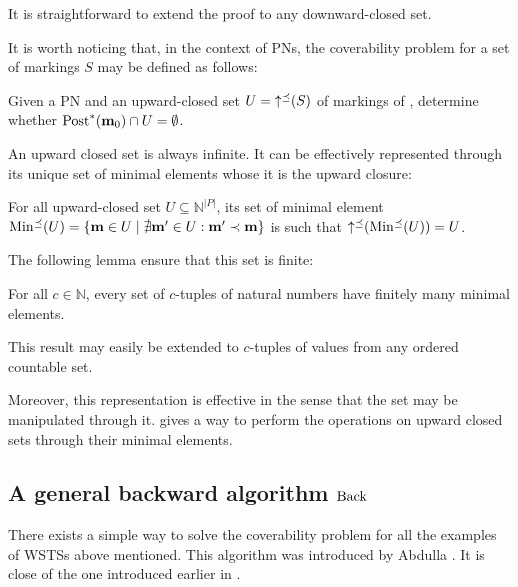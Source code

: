 It is straightforward to extend the proof to any downward-closed set.

It is worth noticing that, in the context of \acp{PN}, the coverability problem for a set of markings $S$ may be defined as follows:
\begin{defi}
  \label{defi:upclocovprblm}
  Given a \ac{PN} \N and an upward-closed set $U = \operatorname{\uparrow^\preceq}(S)$ of markings of \N, determine whether $\operatorname{Post}^*(\mathbf{m}_0) \cap U = \emptyset$.
\end{defi}

An upward closed set is always infinite.
It can be effectively represented through its unique set of minimal elements whose it is the upward closure:
\begin{lemm}
  For all upward-closed set $U \subseteq \mathbb{N}^{|P|}$, its set of minimal element $\operatorname{Min^\preceq}(U) = \{\mathbf{m} \in U \mid \nexists \mathbf{m'} \in U : \mathbf{m'} \prec \mathbf{m}\}$ is such that $\operatorname{\uparrow^\preceq}(\operatorname{Min^\preceq}(U)) = U$.
\end{lemm}

The following lemma ensure that this set is finite:
\begin{lemm}
  For all $c \in \mathbb{N}$, every set of $c$-tuples of natural numbers have finitely many minimal elements.
\end{lemm}
This result may easily be extended to $c$-tuples of values from any ordered countable set.

Moreover, this representation is effective in the sense that the set may be manipulated through it.
\cite{Ganty09} gives a way to perform the operations on upward closed sets through their minimal elements.

\subsection{A general backward algorithm $\operatorname{Back}$}
\label{sec:backward-algorithm}

There exists a simple way to solve the coverability problem for all the examples of \acp{WSTS} above mentioned.
This algorithm was introduced by Abdulla  \citep{Abdulla96}.
It is close of the one introduced earlier in \cite{Finkel90}.

